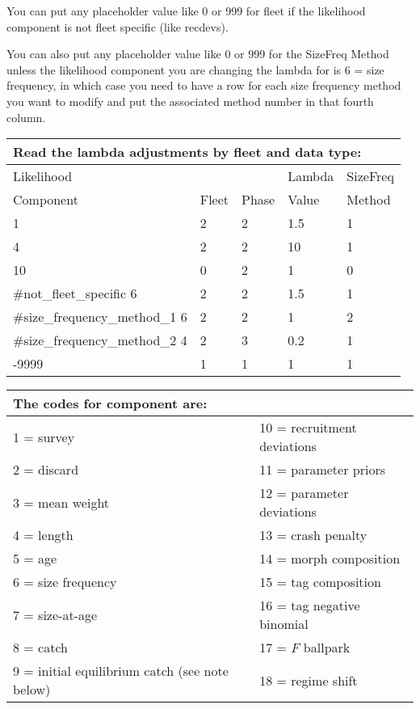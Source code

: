 You can put any placeholder value like 0 or 999 for fleet if the likelihood component is not fleet specific (like recdevs).

You can also put any placeholder value like 0 or 999 for the SizeFreq Method unless the likelihood component you are changing the lambda for is 6 = size frequency, in which case you need to have a row for each size frequency method you want to modify and put the associated method number in that fourth column.

\begin{longtable}{p{3cm} p{3cm} p{2cm} p{3cm} p{3cm}}

	\multicolumn{5}{l}{Read the lambda adjustments by fleet and data type:} \\
	\hline
	Likelihood &       &       & Lambda & SizeFreq \Tstrut\\
	Component  & Fleet & Phase & Value  & Method \Bstrut\\
	\hline
	1 & 2 & 2 & 1.5 & 1 \Tstrut\\
	4 & 2 & 2 & 10 & 1 \\
	10 & 0 & 2 & 1 & 0 \\ \#not\_fleet\_specific
	6 & 2 & 2 & 1.5 & 1 \\ \#size\_frequency\_method\_1
	6 & 2 & 2 & 1 & 2 \\ \#size\_frequency\_method\_2
	4 & 2 & 3 & 0.2 & 1 \\
	-9999 & 1 & 1 & 1 & 1 \Bstrut\\
	\hline
\end{longtable}


\begin{center}
	\begin{longtable}{p{7.5cm} p{7.5cm}}
		\multicolumn{2}{l}{The codes for component are:}\\
		\hline
		1 = survey  				   & 10 = recruitment deviations \Tstrut\\	
		2 = discard 				   & 11 = parameter priors \\		
		3 = mean weight 			   & 12 = parameter deviations \\	
		4 = length 					   & 13 = crash penalty \\		
		5 = age 					   & 14 = morph composition \\
		6 = size frequency  		   & 15 = tag composition \\		
		7 = size-at-age 			   & 16 = tag negative binomial \\
		8 = catch 					   & 17 = $F$ ballpark \\		
		9 = initial equilibrium catch (see note below) & 18 = regime shift \Bstrut\\
		\hline
	\end{longtable}
\end{center}

